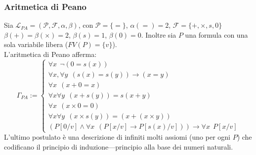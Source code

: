 \subsubsection{Aritmetica di Peano}
Sia $\mathscr{L}_{PA} = ( \mathscr{P}, \mathscr{F}, \alpha, \beta)$, con 
$\mathscr{P} = \{=\}$, $\alpha(=) = 2$, $\mathscr{F} =  \{ + , \times, s, 0\}$ 
$\beta(+) = \beta(\times) = 2$, $\beta(s) = 1$, $\beta(0) =0$. Inoltre sia $P$ una formula con una sola variabile libera ($FV(P) = \{v\}$). \\
L'aritmetica di Peano afferma:
$$
\Gamma_{PA} := 
  \begin{cases}
    \forall x ~~ \neg (0 = s(x)) \\
    \forall x, \forall y ~~ (s(x) = s(y)) \rightarrow (x = y) \\
    \forall x ~~ (x + 0 = x) \\
    \forall x \forall y ~~ (x + s(y)) = s(x+y) \\
    \forall x ~~ (x \times 0 = 0) \\
    \forall x \forall y ~~ (x \times s(y)) = (x + (x \times y)) \\
    (P[0/v] \land \forall x ~~ (P[x/v] \rightarrow P[s(x)/v])) \rightarrow \forall x ~~ P[x/v]
\end{cases}
$$
L'ultimo postulato è una descrizione di infiniti molti assiomi (uno per ogni $P$) che codificano il principio di induzione—principio alla base dei numeri naturali. 

